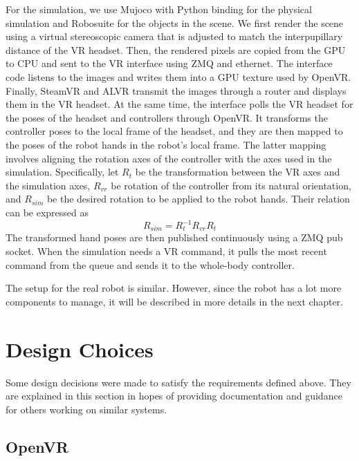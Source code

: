 For the simulation, we use Mujoco with Python binding for the physical simulation and Robosuite \cite{zhu2022robosuite} for the objects in the scene. We first render the scene using a virtual stereoscopic camera that is adjusted to match the interpupillary distance of the VR headset. Then, the rendered pixels are copied from the GPU to CPU and sent to the VR interface using ZMQ and ethernet. The interface code listens to the images and writes them into a GPU texture used by OpenVR. Finally, SteamVR and ALVR transmit the images through a router and displays them in the VR headset. At the same time, the interface polls the VR headset for the poses of the headset and controllers through OpenVR. It transforms the controller poses to the local frame of the headset, and they are then mapped to the poses of the robot hands in the robot's local frame. The latter mapping involves aligning the rotation axes of the controller with the axes used in the simulation. Specifically, let $R_t$ be the transformation between the VR axes and the simulation axes, $R_{vr}$ be rotation of the controller from its natural orientation, and $R_{sim}$ be the desired rotation to be applied to the robot hands. Their relation can be expressed as 
$$
R_{sim} = R_t^{-1} R_{vr} R_t
$$
The transformed hand poses are then published continuously using a ZMQ pub socket. When the simulation needs a VR command, it pulls the most recent command from the queue and sends it to the whole-body controller. 

The setup for the real robot is similar. However, since the robot has a lot more components to manage, it will be described in more details in the next chapter.

\section{Design Choices}

Some design decisions were made to satisfy the requirements defined above. They are explained in this section in hopes of providing documentation and guidance for others working on similar systems.

\subsection{OpenVR}

